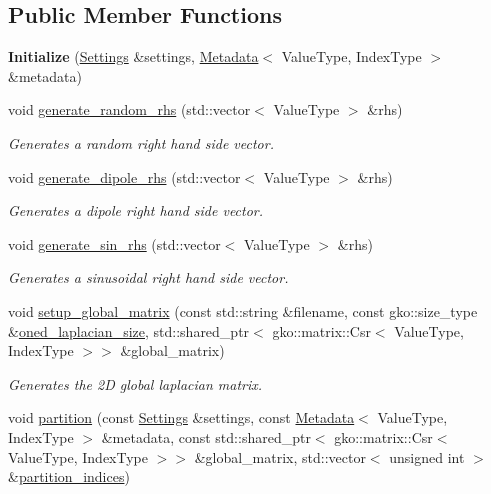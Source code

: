 \subsection*{Public Member Functions}
\begin{DoxyCompactItemize}
\item 
\mbox{\label{classschwz_1_1Initialize_a8ebf7bcf4c67d4ca6af0b5afba5a9a90}} 
{\bfseries Initialize} (\hyperlink{structschwz_1_1Settings}{Settings} \&settings, \hyperlink{structschwz_1_1Metadata}{Metadata}$<$ Value\+Type, Index\+Type $>$ \&metadata)
\item 
void \hyperlink{classschwz_1_1Initialize_a4a6557acd69c4e02d4e1667e728238b8}{generate\+\_\+random\+\_\+rhs} (std\+::vector$<$ Value\+Type $>$ \&rhs)
\begin{DoxyCompactList}\small\item\em Generates a random right hand side vector. \end{DoxyCompactList}\item 
void \hyperlink{classschwz_1_1Initialize_ab72493ff27a800067c9c48effbc1747b}{generate\+\_\+dipole\+\_\+rhs} (std\+::vector$<$ Value\+Type $>$ \&rhs)
\begin{DoxyCompactList}\small\item\em Generates a dipole right hand side vector. \end{DoxyCompactList}\item 
void \hyperlink{classschwz_1_1Initialize_a1b1151ac7f561c1ca4eeac389841e898}{generate\+\_\+sin\+\_\+rhs} (std\+::vector$<$ Value\+Type $>$ \&rhs)
\begin{DoxyCompactList}\small\item\em Generates a sinusoidal right hand side vector. \end{DoxyCompactList}\item 
void \hyperlink{classschwz_1_1Initialize_af655816bbed181e0a243efa7e35e942f}{setup\+\_\+global\+\_\+matrix} (const std\+::string \&filename, const gko\+::size\+\_\+type \&\hyperlink{structschwz_1_1Metadata_a1333605c0573688ce4d71173f52ef2b4}{oned\+\_\+laplacian\+\_\+size}, std\+::shared\+\_\+ptr$<$ gko\+::matrix\+::\+Csr$<$ Value\+Type, Index\+Type $>$$>$ \&global\+\_\+matrix)
\begin{DoxyCompactList}\small\item\em Generates the 2D global laplacian matrix. \end{DoxyCompactList}\item 
void \hyperlink{classschwz_1_1Initialize_a23a10058e35a442c564c0748b66dcb08}{partition} (const \hyperlink{structschwz_1_1Settings}{Settings} \&settings, const \hyperlink{structschwz_1_1Metadata}{Metadata}$<$ Value\+Type, Index\+Type $>$ \&metadata, const std\+::shared\+\_\+ptr$<$ gko\+::matrix\+::\+Csr$<$ Value\+Type, Index\+Type $>$$>$ \&global\+\_\+matrix, std\+::vector$<$ unsigned int $>$ \&\hyperlink{classschwz_1_1Initialize_a007426e21221298b6dca9b7c9fbd1c10}{partition\+\_\+indices})

\end{DoxyCompactItemize}
